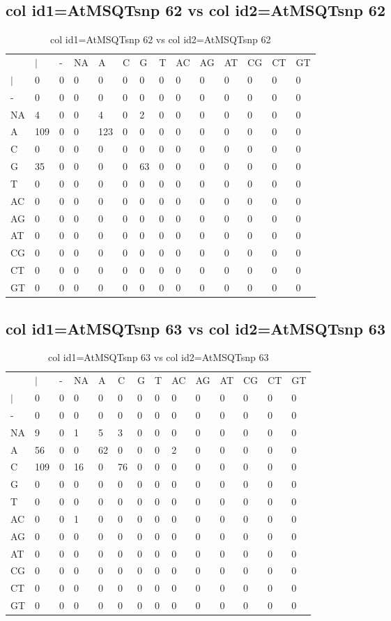 \subsection{col id1=AtMSQTsnp 62 vs col id2=AtMSQTsnp 62}
\begin{center}
\begin{longtable}{|l|l|l|l|l|l|l|l|l|l|l|l|l|l|}
\caption{col id1=AtMSQTsnp 62 vs col id2=AtMSQTsnp 62} \label{table_dm948}\\
\hline
\\
\hline
&$|$&-&NA&A&C&G&T&AC&AG&AT&CG&CT&GT\\
$|$&0&0&0&0&0&0&0&0&0&0&0&0&0\\
-&0&0&0&0&0&0&0&0&0&0&0&0&0\\
NA&4&0&0&4&0&2&0&0&0&0&0&0&0\\
A&109&0&0&123&0&0&0&0&0&0&0&0&0\\
C&0&0&0&0&0&0&0&0&0&0&0&0&0\\
G&35&0&0&0&0&63&0&0&0&0&0&0&0\\
T&0&0&0&0&0&0&0&0&0&0&0&0&0\\
AC&0&0&0&0&0&0&0&0&0&0&0&0&0\\
AG&0&0&0&0&0&0&0&0&0&0&0&0&0\\
AT&0&0&0&0&0&0&0&0&0&0&0&0&0\\
CG&0&0&0&0&0&0&0&0&0&0&0&0&0\\
CT&0&0&0&0&0&0&0&0&0&0&0&0&0\\
GT&0&0&0&0&0&0&0&0&0&0&0&0&0\\
\hline
\end{longtable}
\end{center}

\subsection{col id1=AtMSQTsnp 63 vs col id2=AtMSQTsnp 63}
\begin{center}
\begin{longtable}{|l|l|l|l|l|l|l|l|l|l|l|l|l|l|}
\caption{col id1=AtMSQTsnp 63 vs col id2=AtMSQTsnp 63} \label{table_dm950}\\
\hline
\\
\hline
&$|$&-&NA&A&C&G&T&AC&AG&AT&CG&CT&GT\\
$|$&0&0&0&0&0&0&0&0&0&0&0&0&0\\
-&0&0&0&0&0&0&0&0&0&0&0&0&0\\
NA&9&0&1&5&3&0&0&0&0&0&0&0&0\\
A&56&0&0&62&0&0&0&2&0&0&0&0&0\\
C&109&0&16&0&76&0&0&0&0&0&0&0&0\\
G&0&0&0&0&0&0&0&0&0&0&0&0&0\\
T&0&0&0&0&0&0&0&0&0&0&0&0&0\\
AC&0&0&1&0&0&0&0&0&0&0&0&0&0\\
AG&0&0&0&0&0&0&0&0&0&0&0&0&0\\
AT&0&0&0&0&0&0&0&0&0&0&0&0&0\\
CG&0&0&0&0&0&0&0&0&0&0&0&0&0\\
CT&0&0&0&0&0&0&0&0&0&0&0&0&0\\
GT&0&0&0&0&0&0&0&0&0&0&0&0&0\\
\hline
\end{longtable}
\end{center}


